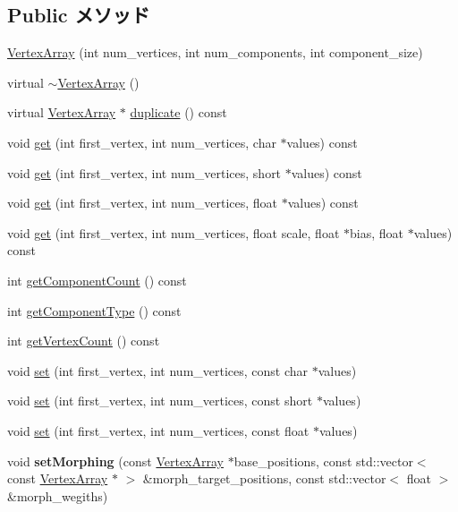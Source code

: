 \subsection*{Public メソッド}
\begin{CompactItemize}
\item 
\hyperlink{classm3g_1_1VertexArray_5f38e30d23b5dc34b223e749e8afd0d0}{VertexArray} (int num\_\-vertices, int num\_\-components, int component\_\-size)
\item 
virtual \hyperlink{classm3g_1_1VertexArray_267fa63cb2f4216729437dc826415911}{$\sim$VertexArray} ()
\item 
virtual \hyperlink{classm3g_1_1VertexArray}{VertexArray} $\ast$ \hyperlink{classm3g_1_1VertexArray_f0dc6a5510bf837ef48129f344d666a8}{duplicate} () const 
\item 
void \hyperlink{classm3g_1_1VertexArray_9d1b801a7c196a07553a5ef4a5473573}{get} (int first\_\-vertex, int num\_\-vertices, char $\ast$values) const 
\item 
void \hyperlink{classm3g_1_1VertexArray_575822f60d7b5e74ed51e94851123038}{get} (int first\_\-vertex, int num\_\-vertices, short $\ast$values) const 
\item 
void \hyperlink{classm3g_1_1VertexArray_79b1ffd7586fe23fb5e31661e4d296e3}{get} (int first\_\-vertex, int num\_\-vertices, float $\ast$values) const 
\item 
void \hyperlink{classm3g_1_1VertexArray_1adedf59e0c6a047242a3914ca52b929}{get} (int first\_\-vertex, int num\_\-vertices, float scale, float $\ast$bias, float $\ast$values) const 
\item 
int \hyperlink{classm3g_1_1VertexArray_7016f51d2788e78fdd736efd040f5e5e}{getComponentCount} () const 
\item 
int \hyperlink{classm3g_1_1VertexArray_9b7b78fbff0603779ec6bdd2a323c939}{getComponentType} () const 
\item 
int \hyperlink{classm3g_1_1VertexArray_c1c9b7f5b0dcd9c0310d7e77e10081ba}{getVertexCount} () const 
\item 
void \hyperlink{classm3g_1_1VertexArray_c92a86c7439c8e38c7e5b69e3eca3ee1}{set} (int first\_\-vertex, int num\_\-vertices, const char $\ast$values)
\item 
void \hyperlink{classm3g_1_1VertexArray_f417744f1798d293c85c5e7fb6e1e846}{set} (int first\_\-vertex, int num\_\-vertices, const short $\ast$values)
\item 
void \hyperlink{classm3g_1_1VertexArray_24b9d666468f856b2bf09e450b20fdfb}{set} (int first\_\-vertex, int num\_\-vertices, const float $\ast$values)
\item 
\hypertarget{classm3g_1_1VertexArray_b5b62e478fb0964ca1c168714a66e562}{
void \textbf{setMorphing} (const \hyperlink{classm3g_1_1VertexArray}{VertexArray} $\ast$base\_\-positions, const std::vector$<$ const \hyperlink{classm3g_1_1VertexArray}{VertexArray} $\ast$ $>$ \&morph\_\-target\_\-positions, const std::vector$<$ float $>$ \&morph\_\-wegiths)}
\label{classm3g_1_1VertexArray_b5b62e478fb0964ca1c168714a66e562}


\end{CompactItemize}
